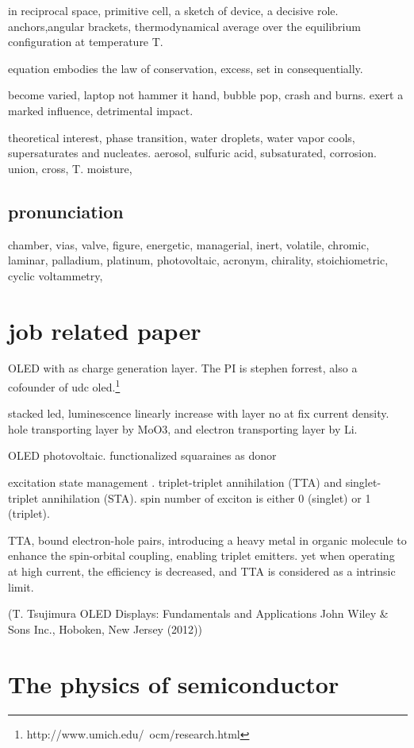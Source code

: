 in reciprocal space, primitive cell, a sketch of device, a decisive role. anchors,angular brackets, thermodynamical average over the equilibrium configuration at temperature T.

equation embodies the law of conservation, excess, set in consequentially.

become varied, laptop not hammer it hand, bubble pop, crash and burns. exert a marked influence, detrimental impact.

theoretical interest, phase transition, water droplets, water vapor cools, supersaturates and nucleates. aerosol, sulfuric acid, subsaturated, corrosion. union, cross, T. moisture,


\subsection{pronunciation}

chamber, vias, valve, figure, energetic, managerial, inert, volatile, chromic,
laminar, palladium, platinum, photovoltaic, acronym, chirality, stoichiometric, cyclic voltammetry,

\section{job related paper}

OLED with  as charge generation layer. \cite{Kanno2006} The PI is stephen forrest, also a cofounder of udc oled.\footnote{http://www.umich.edu/~ocm/research.html}

stacked led, luminescence linearly increase with layer no at fix current density. hole transporting layer by MoO3, and electron transporting layer by Li.

OLED photovoltaic.\cite{Xiao2012a} functionalized squaraines as donor

excitation state management \cite{Zhang2012b}.
triplet-triplet annihilation (TTA) and singlet-triplet annihilation (STA). spin number of exciton is either 0 (singlet) or 1 (triplet).

TTA, bound electron-hole pairs, introducing a heavy metal in organic molecule to enhance the spin-orbital coupling, enabling triplet emitters.\cite{Zhang2013i} yet when operating at high current, the efficiency is decreased, and TTA is considered as a intrinsic limit.


 (T. Tsujimura
OLED Displays: Fundamentals and Applications
John Wiley & Sons Inc., Hoboken, New Jersey (2012))

\section{The physics of semiconductor}

